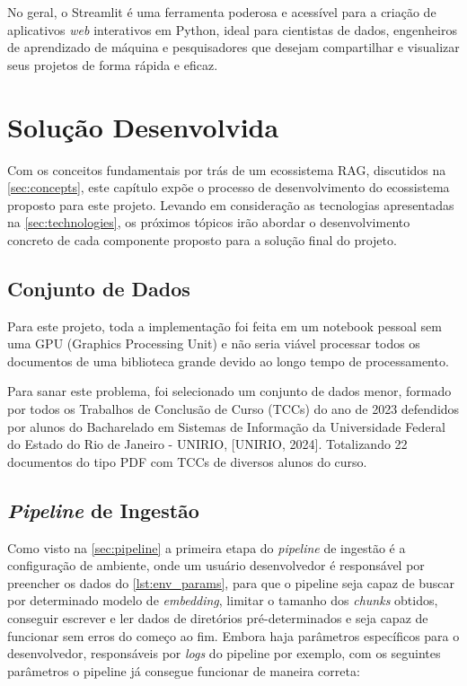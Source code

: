 \documentclass[a4paper, 12pt]{article}
\begin{document}
    No geral, o Streamlit é uma ferramenta poderosa e acessível para a criação de aplicativos \textit{web} interativos em Python, ideal para cientistas de dados, engenheiros de aprendizado de máquina e pesquisadores que desejam compartilhar e visualizar seus projetos de forma rápida e eficaz.

    \clearpage

    \section{Solução Desenvolvida}

    Com os conceitos fundamentais por trás de um ecossistema RAG, discutidos na \autoref{sec:concepts}, este capítulo expõe o processo de desenvolvimento do ecossistema proposto para este projeto. Levando em consideração as tecnologias apresentadas na \autoref{sec:technologies}, os próximos tópicos irão abordar o desenvolvimento concreto de cada componente proposto para a solução final do projeto.

    \subsection{Conjunto de Dados} \label{sec:data}
    Para este projeto, toda a implementação foi feita em um notebook pessoal sem uma GPU (Graphics Processing Unit) e não seria viável processar todos os documentos de uma biblioteca grande devido ao longo tempo de processamento. 
    
    Para sanar este problema, foi selecionado um conjunto de dados menor, formado por todos os Trabalhos de Conclusão de Curso (TCCs) do ano de 2023 defendidos por alunos do Bacharelado em Sistemas de Informação da Universidade Federal do Estado do Rio de Janeiro - UNIRIO, [UNIRIO, 2024]. Totalizando 22 documentos do tipo PDF com TCCs de diversos alunos do curso.

    \subsection{\textit{Pipeline} de Ingestão}
    
    Como visto na \autoref{sec:pipeline} a primeira etapa do \textit{pipeline} de ingestão é a configuração de ambiente, onde um usuário desenvolvedor é responsável por preencher os dados do \autoref{lst:env_params}, para que o pipeline seja capaz de buscar por determinado modelo de \textit{embedding}, limitar o tamanho dos \textit{chunks} obtidos, conseguir escrever e ler dados de diretórios pré-determinados e seja capaz de funcionar sem erros do começo ao fim. Embora haja parâmetros específicos para o desenvolvedor, responsáveis por \textit{logs} do pipeline por exemplo, com os seguintes parâmetros o pipeline já consegue funcionar de maneira correta:
\end{document}
